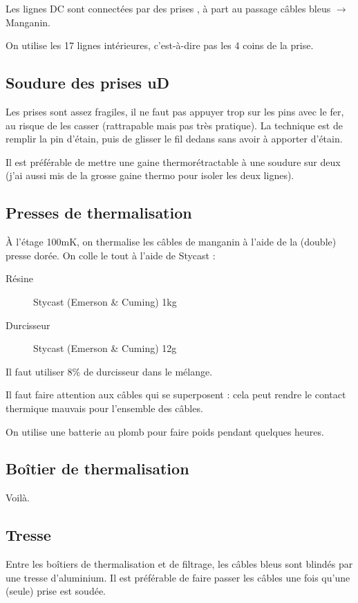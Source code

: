 Les lignes DC sont connectées par des prises \uD, à part au passage câbles bleus $\rightarrow$ Manganin.

On utilise les 17 lignes intérieures, c'est-à-dire pas les 4 coins de la prise.

\subsection{Soudure des prises uD}
Les prises \uD sont assez fragiles, il ne faut pas appuyer trop sur les pins avec le fer, au risque de les casser (rattrapable mais pas très pratique). La technique est de remplir la pin d'étain, puis de glisser le fil dedans sans avoir à apporter d'étain.

Il est préférable de mettre une gaine thermorétractable à une soudure sur deux (j’ai aussi mis de la grosse gaine thermo pour isoler les deux lignes).


\subsection{Presses de thermalisation}
À l'étage 100mK, on thermalise les câbles de manganin à l'aide de la (double) presse dorée. On colle le tout à l'aide de Stycast :
\begin{description}
    \item[Résine] Stycast (Emerson \& Cuming) 1kg
    \item[Durcisseur] Stycast (Emerson \& Cuming) 12g
\end{description}
Il faut utiliser $8\%$ de durcisseur dans le mélange.

Il faut faire attention aux câbles qui se superposent : cela peut rendre le contact thermique mauvais pour l'ensemble des câbles.

On utilise une batterie au plomb pour faire poids pendant quelques heures.

\subsection{Boîtier de thermalisation}
Voilà.

\subsection{Tresse}
Entre les boîtiers de thermalisation et de filtrage, les câbles bleus sont blindés par une tresse d'aluminium. Il est préférable de faire passer les câbles une fois qu'une (seule) prise \uD est soudée.

